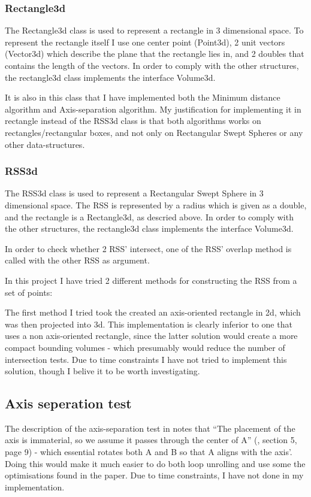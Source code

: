 \subsubsection{Rectangle3d}
\label{rectangle3d}
The Rectangle3d class is used to represent a rectangle in 3 dimensional space. To represent the rectangle itself I use one center point (Point3d), 2 unit vectors (Vector3d) which describe the plane that the rectangle lies in, and 2 doubles that contains the length of the vectors. In order to comply with the other structures, the rectangle3d class implements the interface Volume3d.

It is also in this class that I have implemented both the Minimum distance algorithm and Axis-separation algorithm. My justification for implementing it in rectangle instead of the RSS3d class is that both algorithms works on rectangles/rectangular boxes, and not only on Rectangular Swept Spheres or any other data-structures.

\subsubsection{RSS3d}
\label{RSS3d}
The RSS3d class is used to represent a Rectangular Swept Sphere in 3 dimensional space. The RSS is represented by a radius which is given as a double, and the rectangle is a Rectangle3d, as descried above. In order to comply with the other structures, the rectangle3d class implements the interface Volume3d.

In order to check whether 2 RSS' intersect, one of the RSS' overlap method is called with the other RSS as argument.

In this project I have tried 2 different methods for constructing the RSS from a set of points:

The first method I tried took the created an axis-oriented rectangle in 2d, which was then projected into 3d. This implementation is clearly inferior to one that uses a non axis-oriented rectangle, since the latter solution would create a more compact bounding volumes - which presumably would reduce the number of intersection tests. Due to time constraints I have not tried to implement this solution, though I belive it to be worth investigating. 

\subsection{Axis seperation test}
\label{implementation_axis_sep}
The description of the axis-separation test in \cite{237244} notes that ``The placement of the axis is immaterial, so we assume it passes through the center of A'' (\cite{237244}, section 5, page 9) - which essential rotates both A and B so that A aligns with the axis'. Doing this would make it much easier to do both loop unrolling  and use some the optimisations found in the paper. Due to time constraints, I have not done in my implementation.
